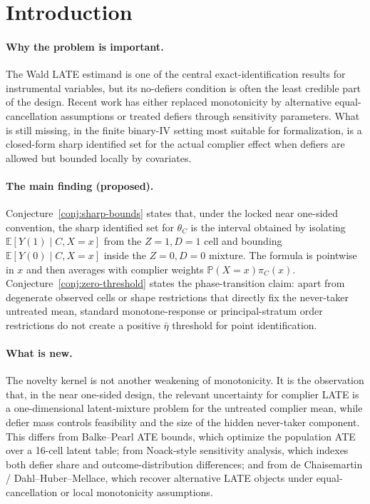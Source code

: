\documentclass[11pt]{article}
\newcommand{\E}{\mathbb{E}}
\renewcommand{\Pr}{\mathbb{P}}
\theoremstyle{definition}
\theoremstyle{plain}
\theoremstyle{remark}
\begin{document}
\section{Introduction}
\paragraph{Why the problem is important.}
The Wald LATE estimand is one of the central exact-identification results for instrumental variables, but its no-defiers condition is often the least credible part of the design.  Recent work has either replaced monotonicity by alternative equal-cancellation assumptions or treated defiers through sensitivity parameters.  What is still missing, in the finite binary-IV setting most suitable for formalization, is a closed-form sharp identified set for the actual complier effect when defiers are allowed but bounded locally by covariates.

\paragraph{The main finding (proposed).}
Conjecture~\ref{conj:sharp-bounds} states that, under the locked near one-sided convention, the sharp identified set for \(\theta_C\) is the interval obtained by isolating \(\E[Y(1)\mid C,X=x]\) from the \(Z=1,D=1\) cell and bounding \(\E[Y(0)\mid C,X=x]\) inside the \(Z=0,D=0\) mixture.  The formula is pointwise in \(x\) and then averages with complier weights \(\Pr(X=x)\pi_C(x)\).  Conjecture~\ref{conj:zero-threshold} states the phase-transition claim: apart from degenerate observed cells or shape restrictions that directly fix the never-taker untreated mean, standard monotone-response or principal-stratum order restrictions do not create a positive \(\bar\eta\) threshold for point identification.

\paragraph{What is new.}
The novelty kernel is not another weakening of monotonicity.  It is the observation that, in the near one-sided design, the relevant uncertainty for complier LATE is a one-dimensional latent-mixture problem for the untreated complier mean, while defier mass controls feasibility and the size of the hidden never-taker component.  This differs from Balke--Pearl ATE bounds, which optimize the population ATE over a 16-cell latent table; from Noack-style sensitivity analysis, which indexes both defier share and outcome-distribution differences; and from de Chaisemartin / Dahl--Huber--Mellace, which recover alternative LATE objects under equal-cancellation or local monotonicity assumptions.
\end{document}
